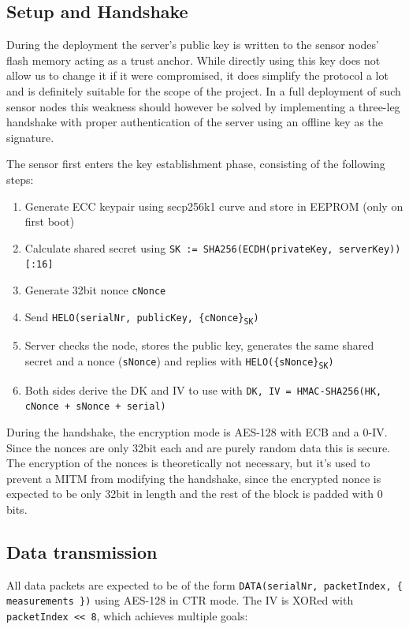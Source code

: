 \documentclass[a4paper,11pt]{scrartcl}
\begin{document}
\subsection{Setup and Handshake}
During the deployment the server's public key is written to the sensor nodes' flash memory acting as a trust anchor. While directly using this key does not allow us to change it if it were compromised, it does simplify the protocol a lot and is definitely suitable for the scope of the project. In a full deployment of such sensor nodes this weakness should however be solved by implementing a three-leg handshake with proper authentication of the server using an offline key as the signature.

The sensor first enters the key establishment phase, consisting of the following steps:
\begin{enumerate}
\item Generate ECC keypair using secp256k1 curve and store in EEPROM (only on first boot)
\item Calculate shared secret using \texttt{SK := SHA256(ECDH(privateKey, serverKey))[:16]}
\item Generate 32bit nonce \texttt{cNonce}
\item Send \texttt{HELO(serialNr, publicKey, \{cNonce\}\textsubscript{SK})}
\item Server checks the node, stores the public key, generates the same shared secret and a nonce (\texttt{sNonce}) and replies with \texttt{HELO(\{sNonce\}\textsubscript{SK})}
\item Both sides derive the DK and IV to use with \texttt{DK, IV = HMAC-SHA256(HK,
cNonce + sNonce + serial)}
\end{enumerate}

During the handshake, the encryption mode is AES-128 with ECB and a 0-IV. Since the nonces are only 32bit each and are purely random data this is secure. The encryption of the nonces is theoretically not necessary, but it's used to prevent a MITM from modifying the handshake, since the encrypted nonce is expected to be only 32bit in length and the rest of the block is padded with 0 bits.

\subsection{Data transmission}
All data packets are expected to be of the form \texttt{DATA(serialNr, packetIndex, \{ measurements \})} using AES-128 in CTR mode. The IV is XORed with \texttt{packetIndex << 8}, which achieves multiple goals:
\end{document}
